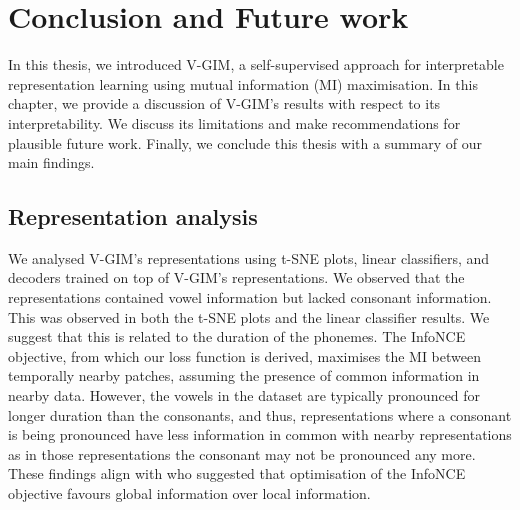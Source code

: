 \chapter{Conclusion and Future work} \label{cha:6}

	
In this thesis, we introduced V-GIM, a self-supervised approach for interpretable representation learning using mutual information (MI) maximisation. In this chapter, we provide a discussion of V-GIM's results with respect to its interpretability. We discuss its limitations and make recommendations for plausible future work. Finally, we conclude this thesis with a summary of our main findings.




\section{Representation analysis} \label{cha:disc_repr_anal}
	
	We analysed V-GIM's representations using t-SNE plots, linear classifiers, and decoders trained on top of V-GIM's representations. We observed that the representations contained vowel information but lacked consonant information. This was observed in both the t-SNE plots and the linear classifier results. We suggest that this is related to the duration of the phonemes. The InfoNCE objective, from which our loss function is derived, maximises the MI between temporally nearby patches, assuming the presence of common information in nearby data. However, the vowels in the dataset are typically pronounced for longer duration than the consonants, and thus, representations where a consonant is being pronounced have less information in common with nearby representations as in those representations the consonant may not be pronounced any more. These findings align with \cite{lowePuttingEndEndtoEnd2020a} who suggested that optimisation of the InfoNCE objective favours global information over local information. 
	
